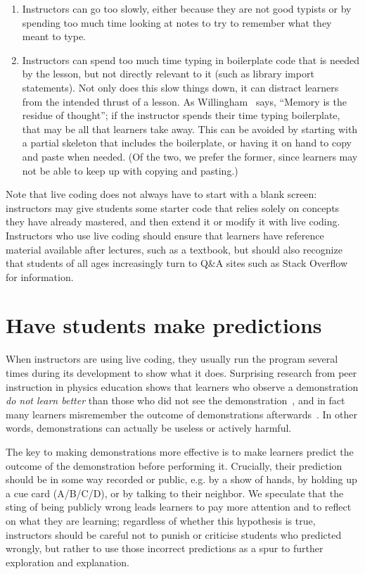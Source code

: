 \documentclass[10pt,letterpaper]{article}
\newcommand{\rulemajor}[2]{\section{#1}\label{#2}}
\newcommand{\evidence}[1]{}
\begin{document}
\begin{enumerate}

\item Instructors can go too slowly, either because they are not good
  typists or by spending too much time looking at notes to try to
  remember what they meant to type.

\item Instructors can spend too much time typing in boilerplate code
  that is needed by the lesson, but not directly relevant to it (such
  as library import statements). Not only does this slow things down, it can distract learners from the
  intended thrust of a lesson.  As Willingham~\cite{willingham-book} says,
  ``Memory is the residue of thought''; if the instructor spends their
  time typing boilerplate, that may be all that learners take away.
  This can be avoided by starting with a partial skeleton that
  includes the boilerplate, or having it on hand to copy and paste
  when needed.  (Of the two, we prefer the former, since learners
  may not be able to keep up with copying and pasting.)

\end{enumerate}

Note that live coding does not always have to start with a blank screen:
instructors may give students some starter code
that relies solely on concepts they have already mastered,
and then extend it or modify it with live coding.
Instructors who use live coding should ensure that
learners have reference material available after lectures,
such as a textbook,
but should also recognize that students of all ages
increasingly turn to Q\&A sites such as Stack Overflow for information.

\rulemajor{Have students make predictions}{predictions}
\evidence{Low}

When instructors are using live coding, they usually run the program
several times during its development to show what it does.  Surprising research
from peer instruction in physics education shows that learners who
observe a demonstration \textit{do not learn better} than those who
did not see the demonstration~\cite{crouch-demo}, and in fact many
learners misremember the outcome of demonstrations
afterwards~\cite{miller-demo}.  In other words, demonstrations can
actually be useless or actively harmful.

The key to making demonstrations more effective is
to make learners predict the outcome of the demonstration before performing it.
Crucially, their prediction should be in some way recorded or public,
e.g. by a show of hands,
by holding up a cue card (A/B/C/D),
or by talking to their neighbor.
We speculate that the sting of being publicly wrong leads learners to pay more attention
and to reflect on what they are learning;
regardless of whether this hypothesis is true,
instructors should be careful not to punish or criticise students who predicted wrongly,
but rather to use those incorrect predictions as a spur to further exploration and explanation.
\end{document}
